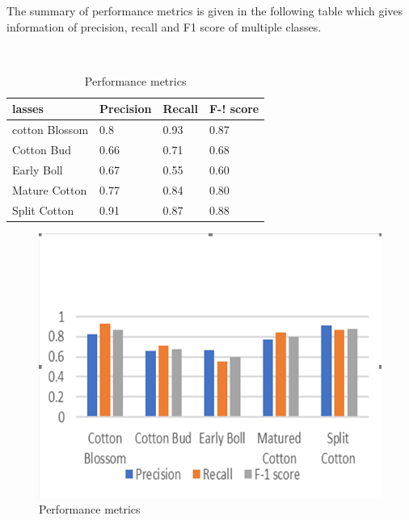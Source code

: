 \documentclass[12pt,a4paper]{report}
\begin{document}
\begin{enumerate}
\par The summary of performance metrics is given in the following table which gives information of precision, recall and F1 score of multiple classes. 




\begin{table}
\begin{center}
\caption{Performance metrics}%
\hspace*{0.2in}
\\
\begin{tabular}{| p{3cm} | p{3cm} | p{3cm} | p{3cm} |}
\hline


{\bf{lasses}}             &{\bf{Precision}}                    & {\bf{Recall}}             &{\bf{F-! score}}  \\ \hline
cotton Blossom                  & 0.8                              & 0.93                       & 0.87        \\ \hline
Cotton Bud                      & 0.66                             & 0.71                       & 0.68        \\ \hline
Early Boll                      & 0.67                             & 0.55                       & 0.60        \\ \hline
Mature Cotton               	& 0.77                             & 0.84                       & 0.80        \\ \hline
Split Cotton                    &0.91	                           & 0.87	                    & 0.88 \\ \hline


\end{tabular}
\end{center}
\end{table}



\begin{figure}[!htb]
\begin{center}
\includegraphics[scale=0.7]{images/results/performance.png}
\caption{Performance metrics}
\end{center}
\end{figure}





\end{enumerate}
\end{document}
